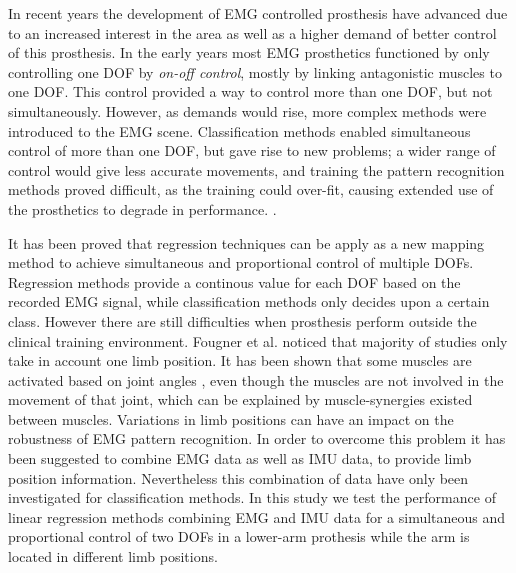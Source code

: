 In recent years the development of EMG controlled prosthesis have advanced due to an increased interest in the area as well as a higher demand of better control of this prosthesis.\cite{fougner2012}
In the early years most EMG prosthetics functioned by only controlling one DOF by \textit{on-off control}, mostly by linking antagonistic muscles to one DOF. %
This control provided a way to control more than one DOF, but not simultaneously. However, as demands would rise, more complex methods were introduced to the EMG scene. Classification methods enabled simultaneous control of more than one DOF, but gave rise to new problems; a wider range of control would give less accurate movements, and training the pattern recognition methods proved difficult, as the training could over-fit, causing extended use of the prosthetics to degrade in performance. \cite{Ison2016}.
 
It has been proved that regression techniques can be apply as a new mapping method to achieve simultaneous and proportional control of multiple DOFs\cite{hanhe2014}. Regression methods provide a continous value for each DOF based on the recorded EMG signal, while classification methods only decides upon a certain class. However there are still difficulties when prosthesis perform outside the clinical training environment\cite{jiang2012}.
 Fougner et al.\cite{Fougner2011} noticed that majority of studies only take in account one limb position. It has been shown that some muscles are activated based on joint angles \cite{reference}, even though the muscles are not involved in the movement of that joint, which can be explained by muscle-synergies existed between muscles.
Variations in limb positions can have an impact on the robustness of EMG pattern recognition. %
In order to overcome this problem it has been suggested to combine EMG data as well as IMU data, to provide limb position information. Nevertheless this combination of data have only been investigated for classification methods. 
In this study we test the performance of linear regression methods combining EMG and IMU data for a simultaneous and proportional control of two DOFs in a lower-arm prothesis while the arm is located in different limb positions.
